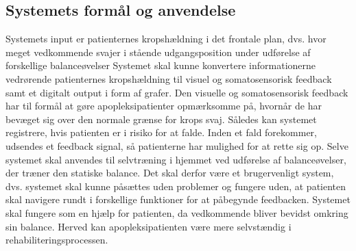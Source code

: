 \subsection{Systemets formål og anvendelse}\label{formaal_anvendelse}
Systemets input er patienternes kropshældning i det frontale plan, dvs. hvor meget vedkommende svajer i stående udgangsposition under udførelse af forskellige balanceøvelser%
Systemet skal kunne konvertere informationerne vedrørende patienternes kropshældning til visuel og somatosensorisk feedback samt et digitalt output i form af grafer. Den visuelle og somatosensorisk feedback har til formål at gøre apopleksipatienter opmærksomme på, hvornår de har bevæget sig over den normale grænse for krops svaj. Således kan systemet registrere, hvis patienten er i risiko for at falde. Inden et fald forekommer, udsendes et feedback signal, så patienterne har mulighed for at rette sig op. Selve systemet skal anvendes til selvtræning i hjemmet ved udførelse af balanceøvelser, der træner den statiske balance. Det skal derfor være et brugervenligt system, dvs. systemet skal kunne påsættes uden problemer og fungere uden, at patienten skal navigere rundt i forskellige funktioner for at påbegynde feedbacken. Systemet skal fungere som en hjælp for patienten, da vedkommende bliver bevidst omkring sin balance. Herved kan apopleksipatienten være mere selvstændig i rehabiliteringsprocessen.
